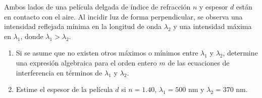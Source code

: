 \item Ambos lados de una película delgada de índice de refracción $n$ y espesor $d$ están en contacto con el aire. Al incidir luz de forma perpendicular, se observa una intensidad reflejada mínima en la longitud de onda $\lambda_2$ y una intensidad máxima en $\lambda_1$, donde $\lambda_1 > \lambda_2$.
\begin{enumerate}
    \item Si se asume que no existen otros máximos o mínimos entre $\lambda_1$ y $\lambda_2$, determine una expresión algebraica para el orden entero $m$ de las ecuaciones de interferencia en términos de $\lambda_1$ y $\lambda_2$.
    \item Estime el espesor de la película $d$ si $n = 1.40$, $\lambda_1 = 500\text{ nm}$ y $\lambda_2 = 370\text{ nm}$.
\end{enumerate}